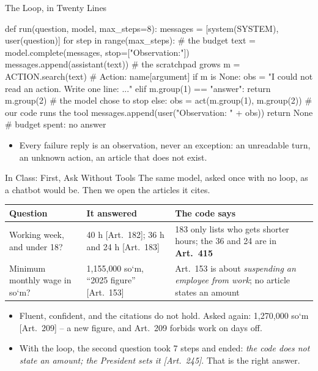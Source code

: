 \begin{frame}[fragile]{The Loop, in Twenty Lines}
\scriptsize
\begin{semiverbatim}
def run(question, model, max_steps=8):
    messages = [system(SYSTEM), user(question)]
    for step in range(max_steps):           \textcolor{RLGreen}{# the budget}
        text = model.complete(messages, stop=["Observation:"])
        messages.append(assistant(text))     \textcolor{RLGreen}{# the scratchpad grows}
        m = ACTION.search(text)              \textcolor{RLGreen}{# Action: name[argument]}
        if m is None:
            obs = "I could not read an action. Write one line: ..."
        elif m.group(1) == "answer":
            return m.group(2)                \textcolor{RLGreen}{# the model chose to stop}
        else:
            obs = act(m.group(1), m.group(2))  \textcolor{RLGreen}{# our code runs the tool}
        messages.append(user("Observation: " + obs))
    return None                              \textcolor{RLGreen}{# budget spent: no answer}
\end{semiverbatim}
\normalsize
\begin{itemize}
  \item Every failure reply is an observation, never an exception: an unreadable turn, an unknown action, an article that does not exist.
\end{itemize}
\end{frame}

\begin{frame}{In Class: First, Ask Without Tools}
\small
The same model, asked once with no loop, as a chatbot would be. Then we open the articles it cites.
\smallskip

\scriptsize
\begin{tabular}{@{}p{}p{}p{}@{}}
\textbf{Question} & \textbf{It answered} & \textbf{The code says} \tabularnewline \hline
\raggedright Working week, and under 18? & \raggedright 40 h [Art.~182]; 36 h and 24 h [Art.~183] & \raggedright 183 only lists who gets shorter hours; the 36 and 24 are in \textbf{Art.~415} \tabularnewline[3pt]
\raggedright Minimum monthly wage in so\textquoteleft m? & \raggedright 1{,}155{,}000 so\textquoteleft m, ``2025 figure'' [Art.~153] & \raggedright Art.~153 is about \emph{suspending an employee from work}; no article states an amount \tabularnewline
\end{tabular}
\pause

\small
\begin{itemize}
  \item Fluent, confident, and the citations do not hold. Asked again: 1{,}270{,}000 so\textquoteleft m [Art.~209] -- a new figure, and Art.~209 forbids work on days off.
  \pause
  \item With the loop, the second question took 7 steps and ended: \emph{the code does not state an amount; the President sets it [Art.~245]}. That is the right answer.
\end{itemize}
\end{frame}

